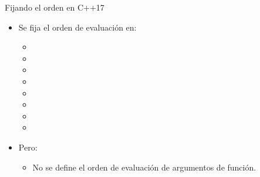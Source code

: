 \begin{frame}[t,fragile]{Fijando el orden en C++17}
\begin{itemize}
  \item Se fija el orden de evaluación en:
    \begin{itemize}
      \item {}
      \item {}
      \item {}
      \item {}
      \item {}
      \item {}
      \item {}
      \item {}
    \end{itemize}

  \vfill\pause
  \item Pero:
    \begin{itemize}
      \item No se define el orden de evaluación de argumentos de función.
    \end{itemize}
\end{itemize}
\end{frame}
